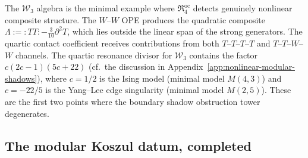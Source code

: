 \begin{remark}
\label{rem:thqg-w3-nonlinear}
The $\mathcal{W}_3$ algebra is the minimal example where
$\mathfrak{R}^{\mathrm{oc}}_4$ detects genuinely nonlinear
composite structure. The $W$--$W$ OPE produces the quadratic
composite $\Lambda := {:}TT{:} - \tfrac{3}{10}\partial^2 T$,
which lies outside the linear span of the strong generators.
The quartic contact coefficient receives contributions from
both $T$--$T$--$T$--$T$ and $T$--$T$--$W$--$W$ channels.
The quartic resonance divisor for $\mathcal{W}_3$ contains the
factor $c(2c - 1)(5c + 22)$
(cf.\ the discussion in
Appendix~\ref{app:nonlinear-modular-shadows}),
where $c = 1/2$ is the Ising model (minimal model $M(4, 3)$)
and $c = -22/5$ is the Yang--Lee edge singularity
(minimal model $M(2, 5)$). These are the first two points
where the boundary shadow obstruction tower degenerates.
\end{remark}

\subsection{The modular Koszul datum, completed}
\label{subsec:thqg-platonic-completed}

